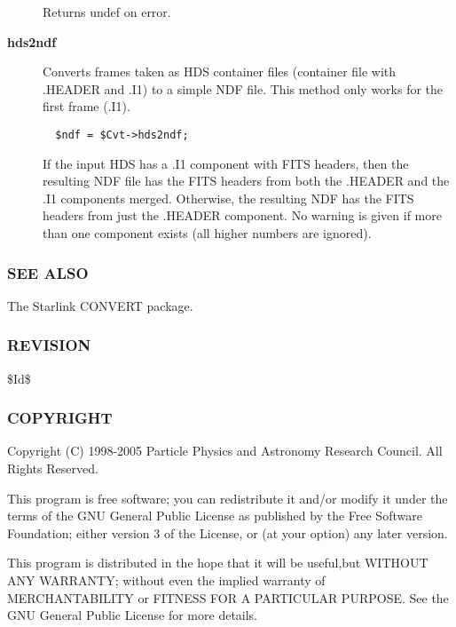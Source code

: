 \begin{description}
Returns undef on error.


\item[{\textbf{hds2ndf}}] \mbox{}

Converts frames taken as HDS container files (container file with
.HEADER and .I1) to a simple NDF file. This method only works
for the first frame (.I1).

\begin{verbatim}
  $ndf = $Cvt->hds2ndf;
\end{verbatim}


If the input HDS has a .I1 component with FITS headers, then the
resulting NDF file has the FITS headers from both the .HEADER and
the .I1 components merged. Otherwise, the resulting NDF has the
FITS headers from just the .HEADER component. No warning is given
if more than one component exists (all higher numbers are ignored).

\end{description}
\subsubsection*{SEE ALSO\label{ORAC::Convert_SEE_ALSO}}


The Starlink CONVERT package.

\subsubsection*{REVISION\label{ORAC::Convert_REVISION}}


\$Id\$

\subsubsection*{COPYRIGHT\label{ORAC::Convert_COPYRIGHT}}


Copyright (C) 1998-2005 Particle Physics and Astronomy Research
Council. All Rights Reserved.



This program is free software; you can redistribute it and/or modify it under
the terms of the GNU General Public License as published by the Free Software
Foundation; either version 3 of the License, or (at your option) any later
version.



This program is distributed in the hope that it will be useful,but WITHOUT ANY
WARRANTY; without even the implied warranty of MERCHANTABILITY or FITNESS FOR A
PARTICULAR PURPOSE. See the GNU General Public License for more details.



